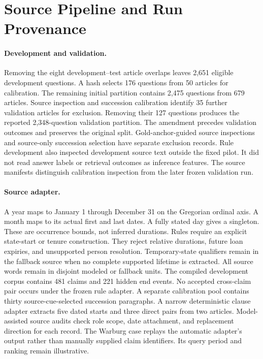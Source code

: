 \section{Source Pipeline and Run Provenance}
\label{app:pipeline}

\paragraph{Development and validation.}
Removing the eight development--test article overlaps leaves 2,651 eligible development questions.
A hash selects 176 questions from 50 articles for calibration.
The remaining initial partition contains 2,475 questions from 679 articles.
Source inspection and succession calibration identify 35 further validation articles for exclusion.
Removing their 127 questions produces the reported 2,348-question validation partition.
The amendment precedes validation outcomes and preserves the original split.
Gold-anchor-guided source inspections and source-only succession selection have separate exclusion records.
Rule development also inspected development source text outside the fixed pilot.
It did not read answer labels or retrieval outcomes as inference features.
The source manifests distinguish calibration inspection from the later frozen validation run.

\paragraph{Source adapter.}
A year maps to January 1 through December 31 on the Gregorian ordinal axis.
A month maps to its actual first and last dates.
A fully stated day gives a singleton.
These are occurrence bounds, not inferred durations.
Rules require an explicit state-start or tenure construction.
They reject relative durations, future loan expiries, and unsupported person resolution.
Temporary-state qualifiers remain in the fallback source when no complete supported lifetime is extracted.
All source words remain in disjoint modeled or fallback units.
The compiled development corpus contains 481 claims and 221 hidden end events.
No accepted cross-claim pair occurs under the frozen rule adapter.
A separate calibration pool contains thirty source-cue-selected succession paragraphs.
A narrow deterministic clause adapter extracts five dated starts and three direct pairs from two articles.
Model-assisted source audits check role scope, date attachment, and replacement direction for each record.
The Warburg case replays the automatic adapter's output rather than manually supplied claim identifiers.
Its query period and ranking remain illustrative.

